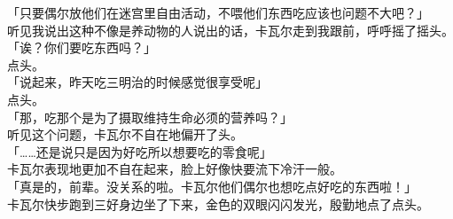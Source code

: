 「只要偶尔放他们在迷宫里自由活动，不喂他们东西吃应该也问题不大吧？」\\

听见我说出这种不像是养动物的人说出的话，卡瓦尔走到我跟前，呼呼摇了摇头。\\

「诶？你们要吃东西吗？」\\

点头。\\

「说起来，昨天吃三明治的时候感觉很享受呢」\\

点头。\\

「那，吃那个是为了摄取维持生命必须的营养吗？」\\

听见这个问题，卡瓦尔不自在地偏开了头。\\

「……还是说只是因为好吃所以想要吃的零食呢」\\

卡瓦尔表现地更加不自在起来，脸上好像快要流下冷汗一般。\\

「真是的，前辈。没关系的啦。卡瓦尔他们偶尔也想吃点好吃的东西啦！」\\

卡瓦尔快步跑到三好身边坐了下来，金色的双眼闪闪发光，殷勤地点了点头。\\

